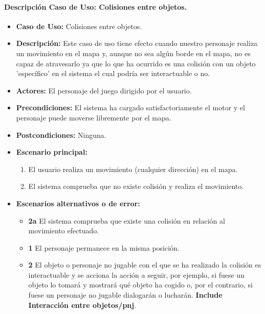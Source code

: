 \documentclass[a4paper,10pt]{article}
\begin{document}
\paragraph*{Descripción Caso de Uso: Colisiones entre objetos.}
\begin{itemize}
\item \textbf{Caso de Uso:} Colisiones entre objetos.
\item \textbf{Descripción:} Este caso de uso tiene efecto cuando nuestro
  personaje realiza un movimiento en el mapa y, aunque no sea algún borde en el
  mapa, no es capaz de atravesarlo ya que lo que ha ocurrido es una colisión con
  un objeto 'específico' en el sistema el cual podría ser interactuable o no.
\item \textbf{Actores:} El personaje del juego dirigido por el usuario.
\item \textbf{Precondiciones:} El sistema ha cargado satisfactoriamente el motor
  y el personaje puede moverse libremente por el mapa.
\item \textbf{Postcondiciones:} Ninguna.
\item \textbf{Escenario principal:} \\
\begin{enumerate}
\item El usuario realiza un movimiento (cualquier dirección) en el mapa.
\item El sistema comprueba que no existe colisión y realiza el movimiento.
\end{enumerate}
\item \textbf{Escenarios alternativos o de error:} \\
\begin{itemize}
\item \textbf{2a} El sistema comprueba que existe una colisión en relación al
  movimiento efectuado. 
\item \textbf{ 1} El personaje permanece en la misma posición.
\item \textbf{ 2} El objeto o personaje no jugable con el que se ha realizado
  la colisión es interactuable y se acciona la acción a seguir, por ejemplo, si
  fuese un objeto lo tomará y mostrará qué objeto ha cogido o, por el
  contrario, si fuese un personaje no jugable dialogarán o
  lucharán. \textbf{Include Interacción entre objetos/pnj}.
\end{itemize}
\end{itemize}
\end{document}
